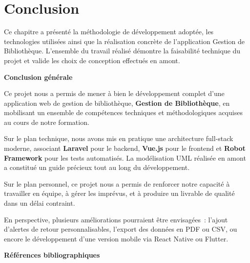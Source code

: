 \documentclass{rapportPFA}
\begin{document}
\section{Conclusion}

Ce chapitre a présenté la méthodologie de développement adoptée, les technologies
utilisées ainsi que la réalisation concrète de l'application Gestion de Bibliothèque.
L'ensemble du travail réalisé démontre la faisabilité technique du projet
et valide les choix de conception effectués en amont.

\newpage
{}
{}
\vspace*{3cm}
\begin{center}
    {\LARGE \textbf{Conclusion générale}}
\end{center}
\vspace{2cm}

Ce projet nous a permis de mener à bien le développement complet d'une application
web de gestion de bibliothèque, \textbf{Gestion de Bibliothèque}, en mobilisant un ensemble de
compétences techniques et méthodologiques acquises au cours de notre formation.

Sur le plan technique, nous avons mis en pratique une architecture full-stack moderne,
associant \textbf{Laravel} pour le backend, \textbf{Vue.js} pour le frontend et
\textbf{Robot Framework} pour les tests automatisés. La modélisation UML réalisée
en amont a constitué un guide précieux tout au long du développement.

Sur le plan personnel, ce projet nous a permis de renforcer notre capacité à
travailler en équipe, à gérer les imprévus, et à produire un livrable de
qualité dans un délai contraint.

En perspective, plusieurs améliorations pourraient être envisagées~: l'ajout
d'alertes de retour personnalisables, l'export des données en PDF ou CSV, ou
encore le développement d'une version mobile via React Native ou Flutter.

\newpage
{}
{}
\vspace*{3cm}
\begin{center}
    {\LARGE \textbf{Références bibliographiques}}
\end{center}
\vspace{2cm}
\end{document}

